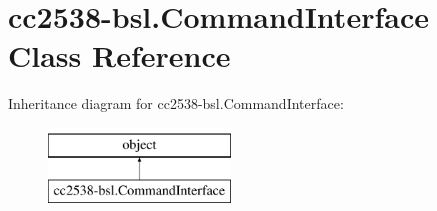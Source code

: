 \hypertarget{classcc2538-bsl_1_1_command_interface}{}\section{cc2538-\/bsl.Command\+Interface Class Reference}
\label{classcc2538-bsl_1_1_command_interface}
Inheritance diagram for cc2538-\/bsl.Command\+Interface\+:\begin{figure}[H]
\begin{center}
\leavevmode
\includegraphics[height=2.000000cm]{classcc2538-bsl_1_1_command_interface}
\end{center}
\end{figure}
